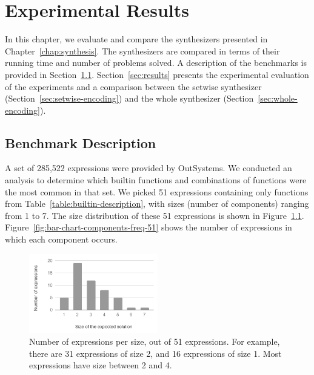 \chapter{Experimental Results}
\label{chap:experimental-results}

In this chapter, we evaluate and compare the synthesizers presented in
Chapter~\ref{chap:synthesis}.
The synthesizers are compared in terms of their running time and number of
problems solved.
A description of the benchmarks is provided in Section~\ref{sec:bench-desc}.
Section~\ref{sec:results} presents the experimental evaluation of the
experiments and a comparison between the setwise synthesizer
(Section~\ref{sec:setwise-encoding}) and the whole synthesizer
(Section~\ref{sec:whole-encoding}).

\section{Benchmark Description}
\label{sec:bench-desc}

A set of 285,522 expressions were provided by OutSystems.
We conducted an analysis to determine which builtin functions and combinations
of functions were the most common in that set.
We picked 51 expressions containing only functions from
Table~\ref{table:builtin-description}, with sizes (number of components) ranging
from 1 to 7.
The size distribution of these 51 expressions is shown in
Figure~\ref{fig:bar-chart-sizes-51}.
Figure~\ref{fig:bar-chart-components-freq-51} shows the number of expressions in
which each component occurs.

\begin{figure}
  \centering
  \includegraphics[width=0.5\textwidth]{assets/bar-chart-sizes-51.pdf}

  \caption{Number of expressions per size, out of 51 expressions.
    For example, there are 31 expressions of size 2, and 16 expressions of size
    1.
    Most expressions have size between 2 and 4.}
  \label{fig:bar-chart-sizes-51}
\end{figure}

